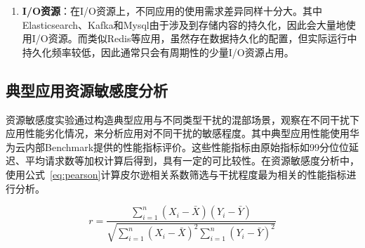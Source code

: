\begin{enumerate}
\begin{figure}[H]
    \centering
    \begin{subfigure}[b]{0.9\textwidth}
      \texttt{[image: profile\_elasticsearch]}
      \caption{Elasticsearch资源指标极差、均值与标准差}
      \label{fig:profile_elasticsearch}
    \end{subfigure}
    \begin{subfigure}[b]{0.9\textwidth}
        \texttt{[image: profile\_render]}
        \caption{Render资源指标极差、均值与标准差}
        \label{fig:profile_render}
    \end{subfigure}
\label{fig:resource_affinity_2}
\end{figure}
    
    \item \textbf{I/O资源}：在I/O资源上，不同应用的使用需求差异同样十分大。其中Elasticsearch、Kafka和Mysql由于涉及到存储内容的持久化，因此会大量地使用I/O资源。而类似Redis等应用，虽然存在数据持久化的配置，但实际运行中持久化频率较低，因此通常只会有周期性的少量I/O资源占用。

\end{enumerate}

\subsection{典型应用资源敏感度分析}

资源敏感度实验通过构造典型应用与不同类型干扰的混部场景，观察在不同干扰下应用性能劣化情况，来分析应用对不同干扰的敏感程度。其中典型应用性能使用华为云内部Benchmark提供的性能指标评价。这些性能指标由原始指标如99分位位延迟、平均请求数等加权计算后得到，具有一定的可比较性。在资源敏感度分析中，使用公式~\eqref{eq:pearson}计算皮尔逊相关系数筛选与干扰程度最为相关的性能指标进行分析。

\begin{equation} \label{eq:pearson}
    r = \frac{\sum_{i=1}^n (X_i - \bar{X})(Y_i - \bar{Y})}{\sqrt{\sum_{i=1}^n (X_i - \bar{X})^2 \sum_{i=1}^n (Y_i - \bar{Y})^2}}
\end{equation}

